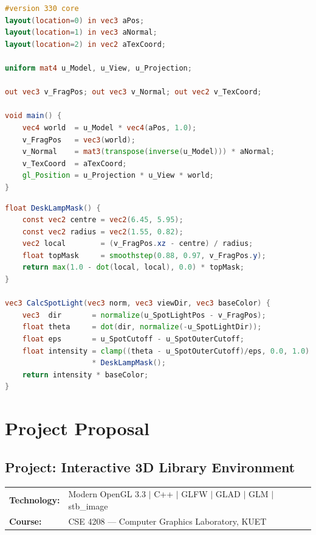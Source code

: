 \documentclass[12pt, a4paper]{article}
\begin{document}
\begin{lstlisting}[language=GLSL, caption={Vertex shader: MVP transform and normal-matrix correction}]
#version 330 core
layout(location=0) in vec3 aPos;
layout(location=1) in vec3 aNormal;
layout(location=2) in vec2 aTexCoord;

uniform mat4 u_Model, u_View, u_Projection;

out vec3 v_FragPos; out vec3 v_Normal; out vec2 v_TexCoord;

void main() {
    vec4 world  = u_Model * vec4(aPos, 1.0);
    v_FragPos   = vec3(world);
    v_Normal    = mat3(transpose(inverse(u_Model))) * aNormal;
    v_TexCoord  = aTexCoord;
    gl_Position = u_Projection * u_View * world;
}
\end{lstlisting}

\begin{lstlisting}[language=GLSL, caption={Fragment shader: desk spotlight with surface mask}]
float DeskLampMask() {
    const vec2 centre = vec2(6.45, 5.95);
    const vec2 radius = vec2(1.55, 0.82);
    vec2 local        = (v_FragPos.xz - centre) / radius;
    float topMask     = smoothstep(0.88, 0.97, v_FragPos.y);
    return max(1.0 - dot(local, local), 0.0) * topMask;
}

vec3 CalcSpotLight(vec3 norm, vec3 viewDir, vec3 baseColor) {
    vec3  dir       = normalize(u_SpotLightPos - v_FragPos);
    float theta     = dot(dir, normalize(-u_SpotLightDir));
    float eps       = u_SpotCutoff - u_SpotOuterCutoff;
    float intensity = clamp((theta - u_SpotOuterCutoff)/eps, 0.0, 1.0)
                    * DeskLampMask();
    return intensity * baseColor;
}
\end{lstlisting}

\section{Project Proposal}

\subsection*{Project: Interactive 3D Library Environment}

\begin{tabular}{ll}
\textbf{Technology:} & Modern OpenGL 3.3 $\mid$ C++ $\mid$ GLFW $\mid$ GLAD $\mid$ GLM $\mid$ stb\_image \\
\textbf{Course:}     & CSE 4208 — Computer Graphics Laboratory, KUET \\
\end{tabular}
\end{document}
